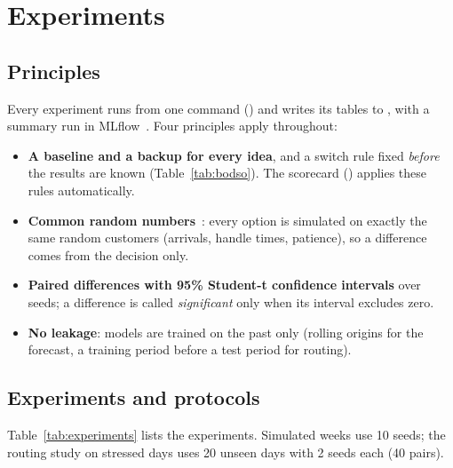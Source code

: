 \section{Experiments}
\label{sec:experiments}

\subsection{Principles}
Every experiment runs from one command () and writes its tables to
, with a summary run in MLflow~\cite{mlflow}. Four principles apply throughout:
\begin{itemize}
  \item \textbf{A baseline and a backup for every idea}, and a switch rule fixed \emph{before} the results are
        known (Table~\ref{tab:bodso}). The scorecard () applies these rules automatically.
  \item \textbf{Common random numbers}~\cite{law}: every option is simulated on exactly the same random
        customers (arrivals, handle times, patience), so a difference comes from the decision only.
  \item \textbf{Paired differences with 95\% Student-t confidence intervals} over seeds; a difference is called
        \emph{significant} only when its interval excludes zero.
  \item \textbf{No leakage}: models are trained on the past only (rolling origins for the forecast, a training
        period before a test period for routing).
\end{itemize}

\subsection{Experiments and protocols}
Table~\ref{tab:experiments} lists the experiments. Simulated weeks use 10 seeds; the routing study on stressed
days uses 20 unseen days with 2 seeds each (40 pairs).

